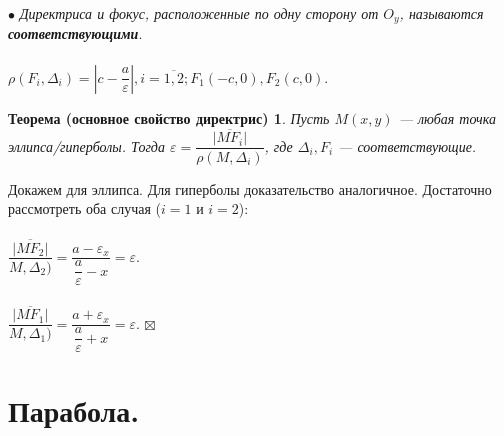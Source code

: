 \documentclass[a4paper, 12pt]{report}
\newenvironment{Proof} %
{\par\noindent{$\blacklozenge$}} %
{\hfill$\scriptstyle\boxtimes$}
\begin{document}
$\bullet$ \textit{Директриса и фокус, расположенные по одну сторону от $O_y$, называются \textbf{соответствующими}}.\\\\
$\rho(F_i, \Delta_i) = |c - \dfrac{a}{\varepsilon}|, i = \overline{1, 2}; F_1(-c, 0), F_2(c, 0)$.
\newtheorem*{th18}{Теорема (основное свойство директрис)}\begin{th18}Пусть $M(x, y)$ --- любая точка эллипса/гиперболы. Тогда $\varepsilon = \dfrac{\overline{|MF_i|}}{\rho(M, \Delta_i)}$, где $\Delta_i, F_i$ --- соответствующие.
\end{th18}
\begin{Proof}
	Докажем для эллипса. Для гиперболы доказательство аналогичное. Достаточно рассмотреть оба случая ($i = 1$ и $i = 2$):\\\\
	$\dfrac{\overline{|MF_2|}}{M, \Delta_2)} = \dfrac{a - \varepsilon_x}{\dfrac{a}{\varepsilon} - x} = \varepsilon$.\\\\
	$\dfrac{\overline{|MF_1|}}{M, \Delta_1)} = \dfrac{a + \varepsilon_x}{\dfrac{a}{\varepsilon} + x} = \varepsilon$.
\end{Proof}




\section{Парабола.}
\end{document}
